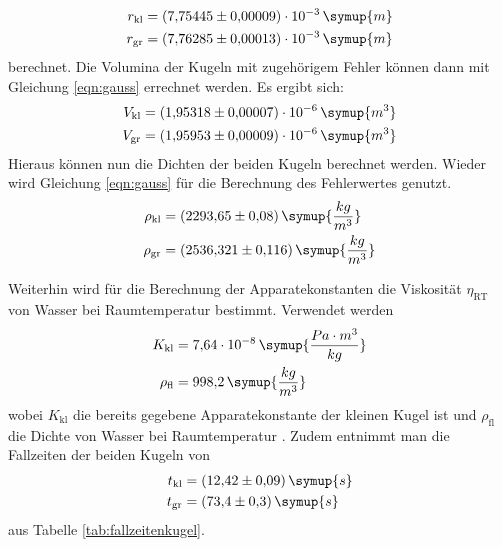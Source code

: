 \begin{equation*}
\begin{aligned}
r_{\text{kl}} &= (7{,}75445 \pm 0{,}00009) \cdot 10^{-3}\,\symup{m} \\
r_{\text{gr}} &= (7{,}76285 \pm 0{,}00013) \cdot 10^{-3}\,\symup{m}
\end{aligned}
\end{equation*}
berechnet. Die Volumina der Kugeln mit zugehörigem Fehler können dann mit Gleichung \eqref{eqn:gauss} errechnet werden. Es ergibt sich:
\begin{equation*}
\begin{aligned}
V_{\text{kl}} &= (1{,}95318 \pm 0{,}00007) \cdot 10^{-6}\,\symup{m^3} \\
V_{\text{gr}} &= (1{,}95953 \pm 0{,}00009) \cdot 10^{-6}\,\symup{m^3}
\end{aligned}
\end{equation*}
Hieraus können nun die Dichten der beiden Kugeln berechnet werden. Wieder wird Gleichung \eqref{eqn:gauss} für die Berechnung des Fehlerwertes genutzt.
\begin{equation*}
\begin{aligned}
\rho_{\text{kl}} &= (2293{,}65 \pm 0{,}08)\, \symup{\frac{kg}{m^3}} \\
\rho_{\text{gr}} &= (2536{,}321 \pm 0{,}116)\, \symup{\frac{kg}{m^3}}
\end{aligned}
\end{equation*}
 
Weiterhin wird für die Berechnung der Apparatekonstanten die Viskosität $\eta_{\text{RT}}$ von Wasser bei Raumtemperatur bestimmt. Verwendet werden
\begin{equation*}
\begin{aligned}
K_{\text{kl}} &= 7{,}64 \cdot 10^{-8}\, \symup{\frac{Pa \cdot m^3}{kg}} \\
\rho_{\text{fl}} &= 998{,}2 \, \symup{\frac{kg}{m^3}}
\end{aligned}
\end{equation*}
wobei $K_{\text{kl}}$ die bereits gegebene Apparatekonstante der kleinen Kugel ist und $\rho_{\text{fl}}$ die Dichte von Wasser bei Raumtemperatur \cite{waterdensity}.
Zudem entnimmt man die Fallzeiten der beiden Kugeln von
\begin{equation*}
\begin{aligned}
t_{\text{kl}} &= (12{,}42 \pm 0{,}09)\, \symup{s} \\
t_{\text{gr}} &= (73{,}4 \pm 0{,}3)\, \symup{s} \\
\end{aligned}
\end{equation*}
aus Tabelle \eqref{tab:fallzeitenkugel}.


